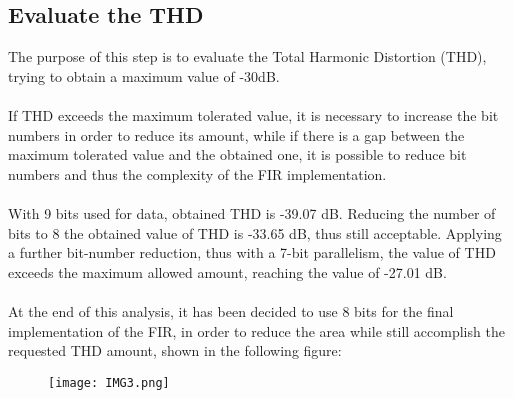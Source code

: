 \subsection{Evaluate the THD}

The purpose of this step is to evaluate the Total Harmonic Distortion (THD), trying to obtain a maximum 
value of -30dB. 
\paragraph{}
If THD exceeds the maximum tolerated value, it is necessary to increase 
the bit numbers in order to reduce its amount, while if there is a gap between the maximum tolerated value 
and the obtained one, it is possible to reduce bit numbers and thus the complexity of the FIR implementation.
\paragraph{}
With 9 bits used for data, obtained THD is -39.07 dB. 
Reducing the number of bits to 8 the obtained value of THD  
is -33.65 dB, thus still acceptable. 
Applying a further bit-number reduction, thus with a 7-bit parallelism, the value of THD exceeds the maximum allowed
amount, reaching the value of -27.01 dB.
\paragraph{}
At the end of this analysis, it has been decided to use 8 bits for the final implementation of the  FIR, 
in order to reduce the area while still accomplish the requested THD amount, shown in the following figure: %
\begin{figure}[!h]
	\texttt{[image: IMG3.png]}
	\centering
\end{figure}

